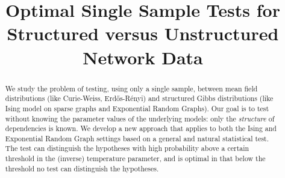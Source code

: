 \documentclass[final,12pt]{colt2018}
\title[Comparing Structured and Unstructured Network Data]{Optimal Single Sample Tests for \\ Structured versus Unstructured Network Data}
\begin{document}




\maketitle


\begin{abstract}%
 We study the problem of testing, using only a single sample, between mean field distributions (like Curie-Weiss, Erd\H{o}s-R\'enyi) and structured Gibbs distributions (like Ising model on sparse graphs and Exponential Random Graphs). 
Our goal is to test without knowing the parameter values of the underlying models: only the \emph{structure} of dependencies is known.  
We develop a new approach that applies to both the Ising and Exponential Random Graph settings based on a general and natural statistical test. The test can distinguish the hypotheses with high probability above a certain threshold in the (inverse) temperature parameter, and is optimal in that below the threshold no test can distinguish the hypotheses. 
 

\end{abstract}
\end{document}
